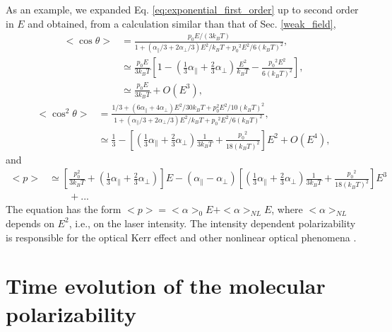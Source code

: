\documentclass[12pt,letterpaper]{article}
\begin{document}
As an example, we expanded Eq. \eqref{eq:exponential_first_order} up to second order in $E$ and obtained, from a calculation similar than that of Sec. \ref{weak_field},
\begin{subequations}\label{eq:statistics_second_order_cos}
 \begin{align}
  <\cos\theta>&=\frac{p_0E/(3k_BT)}{1+\left(\alpha_\parallel/3+2\alpha_\bot/3\right){E}^{2}/k_BT+{p_0}^{2}{E}^{2}/6(k_BT)^{2}},\\
  &\simeq \frac{p_0E}{3k_BT}\left[1-\left(\frac{1}{3}\alpha_\parallel+\frac{2}{3}\alpha_\bot\right)\frac{E^{2}}{k_BT}-\frac{{p_0}^{2}{E}^{2}}{6(k_BT)^{2}}\right],\\
  &\simeq \frac{p_0E}{3k_BT} + O(E^3),	
 \end{align}
\end{subequations}
\begin{subequations}\label{eq:statistics_second_order_cos_sqr}
 \begin{align}
  <\cos^2\theta>&=\frac{1/3 + \left(6\alpha_\parallel +4\alpha_\bot\right)E^2/30k_BT+p_0^2E^2/10(k_BT)^{2}}{1+\left(\alpha_\parallel/3+2\alpha_\bot/3\right){E}^{2}/k_BT+{p_0}^{2}{E}^{2}/6(k_BT)^{2}},\\
&\simeq \frac{1}{3} - \left[\left(\frac{1}{3}\alpha_\parallel+\frac{2}{3}\alpha_\bot\right)\frac{1}{3k_BT}+\frac{{p_0}^{2}}{18(k_BT)^{2}}\right]E^2 + O(E^4),
 \end{align}
\end{subequations}
and
\begin{align}\label{eq:total_pol_second_order}
 <p>&\simeq\left[\frac{p_0^2}{3k_BT}+\left(\frac{1}{3}\alpha_\parallel+\frac{2}{3}\alpha_\bot\right)\right]E - (\alpha_\parallel - \alpha_\bot)\left[\left(\frac{1}{3}\alpha_\parallel+\frac{2}{3}\alpha_\bot\right)\frac{1}{3k_BT}+\frac{{p_0}^{2}}{18(k_BT)^{2}}\right]E^3\nonumber\\ 
 &\qquad + ...
\end{align}
The equation has the form $<p>=<\alpha>_0E + <\alpha>_{NL}E$, where $<\alpha>_{NL}$ depends on $E^2$, i.e., on the laser intensity. The intensity dependent polarizability is responsible for the optical Kerr effect and other nonlinear optical phenomena \cite{boyd2008}.


\section{Time evolution of the molecular polarizability}\label{time}

 

\end{document}
